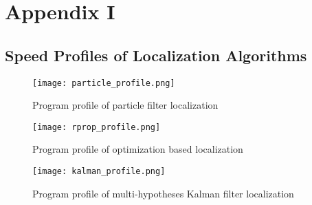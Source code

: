 \chapter{Appendix I}\label{testdat}

\section{Speed Profiles of Localization Algorithms}\label{sec:profiles}
\begin{figure}[h!]
  \texttt{[image: particle\_profile.png]}
    \caption{Program profile of particle filter localization}
    \label{fig:profile_partcile}
\end{figure}

\begin{figure}[h!]
  \texttt{[image: rprop\_profile.png]}
    \caption{Program profile of optimization based localization}
    \label{fig:profile_rprop}
\end{figure}

\begin{figure}[h!]
  \texttt{[image: kalman\_profile.png]}
    \caption{Program profile of multi-hypotheses Kalman filter localization}
    \label{fig:profile_kalman}
\end{figure}


